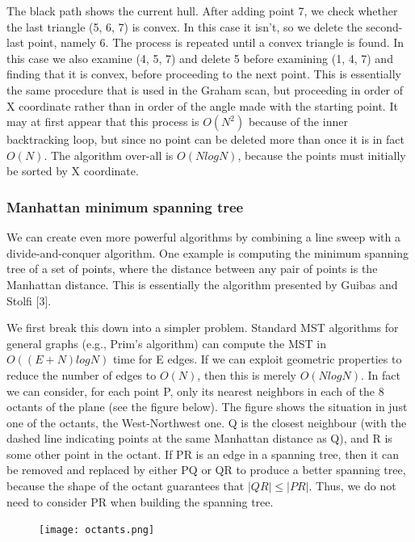\documentclass[a4paper,12pt]{article}
\begin{document}
The black path shows the current hull. After adding point 7, we check whether the last 
triangle (5, 6, 7) is convex. In this case it isn't, so we delete the second-last point, 
namely 6. The process is repeated until a convex triangle is found. In this case we also 
examine (4, 5, 7) and delete 5 before examining (1, 4, 7) and finding that it is convex, 
before proceeding to the next point. This is essentially the same procedure that is used in 
the Graham scan, but proceeding in order of X coordinate rather than in order of the angle 
made with the starting point. It may at first appear that this process is $O(N^2)$ because of 
the inner backtracking loop, but since no point can be deleted more than once it is in fact 
$O(N)$. The algorithm over-all is $O(N log N)$, because the points must initially be sorted by 
X coordinate.

\subsubsection{Manhattan minimum spanning tree} \indent

We can create even more powerful algorithms by combining a line sweep with a 
divide-and-conquer algorithm. One example is computing the minimum spanning tree of a set 
of points, where the distance between any pair of points is the Manhattan distance. This is 
essentially the algorithm presented by Guibas and Stolfi [3].

We first break this down into a simpler problem. Standard MST algorithms for general graphs 
(e.g., Prim's algorithm) can compute the MST in $O((E + N) log N)$ time for E edges. If we can 
exploit geometric properties to reduce the number of edges to $O(N)$, then this is merely 
$O(N log N)$. In fact we can consider, for each point P, only its nearest neighbors in each 
of the 8 octants of the plane (see the figure below). The figure shows the situation in just 
one of the octants, the West-Northwest one. Q is the closest neighbour 
(with the dashed line indicating points at the same Manhattan distance as Q), and R is some 
other point in the octant. If PR is an edge in a spanning tree, then it can be removed and 
replaced by either PQ or QR to produce a better spanning tree, because the shape of the 
octant guarantees that $|QR| \leq |PR|$. Thus, we do not need to consider PR when building the 
spanning tree.

\begin{figure}[ht]
  \centering
  \texttt{[image: octants.png]}
\end{figure}
\end{document}
